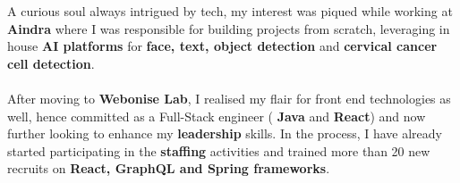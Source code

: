 \documentclass[10pt,a4paper,ragged2e,withhyper]{altacv}
\begin{document}
\begin{paracol}{2}

A curious soul always intrigued by tech, my interest was piqued while working at \textbf{Aindra} where I was responsible for building projects from scratch, leveraging in house \textbf{AI platforms} for \textbf{face, text, object detection} and \textbf{cervical cancer cell detection}.\\~\\

After moving to \textbf{Webonise Lab}, I realised my flair for front end technologies as well, hence committed as a Full-Stack engineer ( \textbf{Java} and \textbf{React}) and now further looking to enhance my \textbf{leadership} skills. In the process, I have already started participating in the \textbf{staffing} activities and trained more than 20 new recruits on \textbf{React, GraphQL and Spring frameworks}.









\\
\\
\divider\smallskip

\\




\end{paracol}
\end{document}
